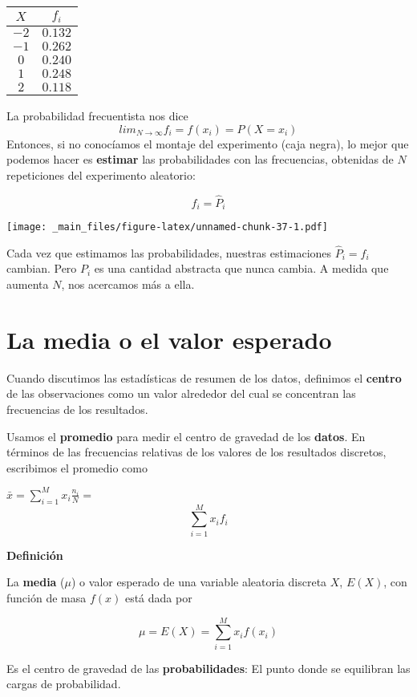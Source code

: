 \documentclass[
]{book}
\begin{document}
\begin{longtable}[]{@{}cc@{}}
\toprule
\(X\) & \(f_i\) \\
\midrule
\endhead
\(-2\) & \(0.132\) \\
\(-1\) & \(0.262\) \\
\(0\) & \(0.240\) \\
\(1\) & \(0.248\) \\
\(2\) & \(0.118\) \\
\bottomrule
\end{longtable}

La probabilidad frecuentista nos dice
\[lim_{N \rightarrow \infty} f_i = f(x_i)=P(X=x_i)\]
Entonces, si no conocíamos el montaje del experimento (caja negra), lo mejor que podemos hacer es \textbf{estimar} las probabilidades con las frecuencias, obtenidas de \(N\) repeticiones del experimento aleatorio:

\[f_i = \hat{P}_i\]

\texttt{[image: \_main\_files/figure-latex/unnamed-chunk-37-1.pdf]}

Cada vez que estimamos las probabilidades, nuestras estimaciones \(\hat{P}_i=f_i\) cambian. Pero \(P_i\) es una cantidad abstracta que nunca cambia. A medida que aumenta \(N\), nos acercamos más a ella.

\hypertarget{la-media-o-el-valor-esperado}{%
\section{La media o el valor esperado}\label{la-media-o-el-valor-esperado}}

Cuando discutimos las estadísticas de resumen de los datos, definimos el \textbf{centro} de las observaciones como un valor alrededor del cual se concentran las frecuencias de los resultados.

Usamos el \textbf{promedio} para medir el centro de gravedad de los \textbf{datos}. En términos de las frecuencias relativas de los valores de los resultados discretos, escribimos el promedio como

\(\bar{x}= \sum_{i=1}^M x_i \frac{n_i}{N}=\) \[\sum_{i=1}^M x_i f_i\]

\textbf{Definición}

La \textbf{media} (\(\mu\)) o valor esperado de una variable aleatoria discreta \(X\), \(E(X)\), con función de masa \(f(x)\) está dada por

\[ \mu = E(X)= \sum_{i=1}^M x_i f(x_i) \]

Es el centro de gravedad de las \textbf{probabilidades}: El punto donde se equilibran las cargas de probabilidad.
\end{document}
